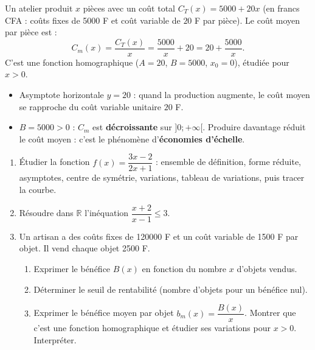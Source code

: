\documentclass[11pt]{article}
\begin{document}
\begin{exemplebox}
Un atelier produit $x$ pièces avec un coût total $C_T(x) = 5000 + 20x$ (en francs CFA : coûts fixes de \num{5000} F et coût variable de $20$ F par pièce).
Le coût moyen par pièce est :
\[
C_m(x) = \frac{C_T(x)}{x} = \frac{5000}{x} + 20 = 20 + \frac{5000}{x}.
\]
C'est une fonction homographique ($A = 20$, $B = 5000$, $x_0 = 0$), étudiée pour $x > 0$.
\begin{itemize}
    \item Asymptote horizontale $y = 20$ : quand la production augmente, le coût moyen se rapproche du coût variable unitaire $20$ F.
    \item $B = 5000 > 0$ : $C_m$ est \textbf{décroissante} sur $]0; +\infty[$. Produire davantage réduit le coût moyen : c'est le phénomène d'\textbf{économies d'échelle}.
\end{itemize}
\end{exemplebox}

\begin{exercice}[Entraînement]
\begin{enumerate}
    \item Étudier la fonction $f(x) = \dfrac{3x-2}{2x+1}$ : ensemble de définition, forme réduite, asymptotes, centre de symétrie, variations, tableau de variations, puis tracer la courbe.
    \item Résoudre dans $\mathbb{R}$ l'inéquation $\dfrac{x+2}{x-1} \leq 3$.
    \item Un artisan a des coûts fixes de \num{120000} F et un coût variable de \num{1500} F par objet. Il vend chaque objet \num{2500} F.
    \begin{enumerate}
        \item Exprimer le bénéfice $B(x)$ en fonction du nombre $x$ d'objets vendus.
        \item Déterminer le seuil de rentabilité (nombre d'objets pour un bénéfice nul).
        \item Exprimer le bénéfice moyen par objet $b_m(x) = \dfrac{B(x)}{x}$. Montrer que c'est une fonction homographique et étudier ses variations pour $x > 0$. Interpréter.
    \end{enumerate}
\end{enumerate}
\end{exercice}
\end{document}
